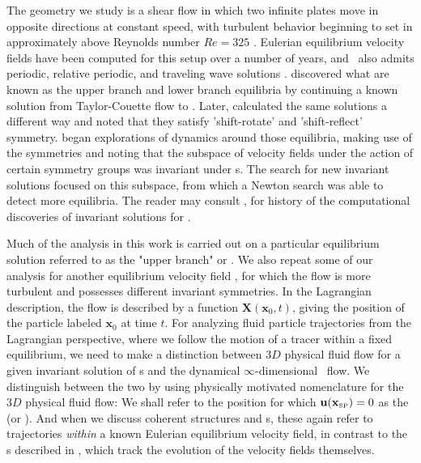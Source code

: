 The {\pC} geometry we study is a shear flow in which two infinite 
plates move in opposite directions at constant speed, with turbulent 
behavior beginning to set in approximately above Reynolds number $Re=325$ 
\citep{GHCV08}. Eulerian equilibrium velocity fields have been computed 
for this setup over a number of years, and \pCf\ also admits periodic, 
relative periodic, and traveling wave solutions \citep{GHCV08,DV04}. 
\citet{N90} discovered what are known as the upper branch and 
lower branch equilibria by continuing a known solution from 
Taylor-Couette flow to {\pC}. Later, %
\citet{W03} 
calculated the same solutions a different way and noted that they satisfy 
'shift-rotate' and 'shift-reflect' symmetry. 
\citet{GHCW07} 
began explorations of {\pC} dynamics around those equilibria, 
making use of the symmetries and noting that the subspace of velocity 
fields under the action of certain symmetry groups was invariant under 
{\NSe}s. The search for new invariant solutions focused on this 
subspace, from which a Newton search was able to detect more equilibria. 
The reader may consult \citet{GHCV08}, \citet{GHCW07} for 
history of the computational discoveries of invariant solutions for 
{\pCf}. 


Much of the analysis in this work is carried out on a particular 
equilibrium solution referred to as the "upper branch" or {\tEQtwo}. We also 
repeat some of our analysis  for another equilibrium velocity field 
{\tEQeight}, for which the flow is more turbulent and possesses different 
invariant symmetries. In the Lagrangian description, the flow is described by a function 
$\mathbf {X}\left(\mathbf{x}_{0},t\right)$, 
giving the position of the particle labeled $\mathbf{x}_{0}$ at time $t$.  For analyzing fluid particle trajectories from the 
Lagrangian perspective, where we follow the motion of a tracer within a 
fixed equilibrium,  we need to make a distinction between $3D$ physical 
fluid flow for a given invariant solution of {\NSe}s and the dynamical 
$\infty$-dimensional \statesp\ flow. We distinguish between the two by 
using physically motivated nomenclature for the $3D$ physical fluid flow: 
We shall refer to the position for which $\bu(\xSP{})=0$ as the {\em 
\stagp} \xSP{} (or \tSP{}). And when we discuss coherent 
structures and {\hc}s, these again refer to trajectories \emph{within} 
a known Eulerian equilibrium velocity field, in contrast to the {\hc}s 
described in \citet{GHCV08}, which track the evolution of the 
velocity fields themselves. 


